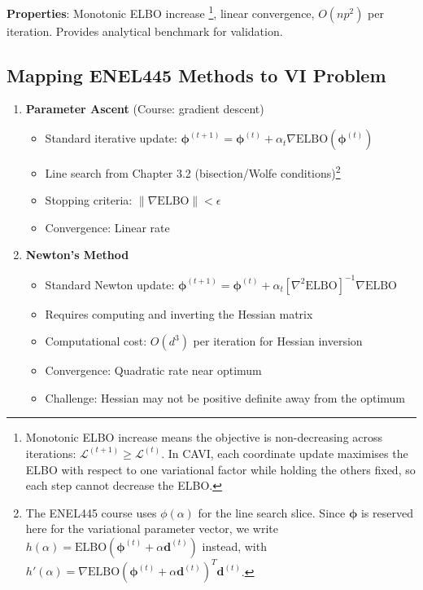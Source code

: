 \documentclass[11pt]{article}
\newcommand{\ELBO}{\text{ELBO}}
\begin{document}
\textbf{Properties}: Monotonic ELBO increase \footnote{Monotonic ELBO increase means the objective is non-decreasing across iterations: $\mathcal{L}^{(t+1)} \ge \mathcal{L}^{(t)}$. In CAVI, each coordinate update maximises the ELBO with respect to one variational factor while holding the others fixed, so each step cannot decrease the ELBO.}, linear convergence, $O(np^2)$ per iteration. Provides analytical benchmark for validation.


\newpage 

\subsection*{Mapping ENEL445 Methods to VI Problem}

\begin{enumerate}[leftmargin=*]
\item \textbf{Parameter Ascent} (Course: gradient descent)
\begin{itemize}
\item Standard iterative update: $\bm{\phi}^{(t+1)} = \bm{\phi}^{(t)} + \alpha_t \nabla \ELBO(\bm{\phi}^{(t)})$
\item Line search from Chapter 3.2 (bisection/Wolfe conditions)\footnote{The ENEL445 course uses $\phi(\alpha)$ for the line search slice. Since $\bm{\phi}$ is reserved here for the variational parameter vector, we write $h(\alpha) = \text{ELBO}(\bm{\phi}^{(t)} + \alpha\bm{d}^{(t)})$ instead, with $h'(\alpha) = \nabla\text{ELBO}(\bm{\phi}^{(t)} + \alpha\bm{d}^{(t)})^T\bm{d}^{(t)}$.}
\item Stopping criteria: $\|\nabla \ELBO\| < \epsilon$
\item Convergence: Linear rate
\end{itemize}

\item \textbf{Newton's Method}   
\begin{itemize}
\item Standard Newton update: $\bm{\phi}^{(t+1)} = \bm{\phi}^{(t)} + \alpha_t [\nabla^2 \ELBO]^{-1} \nabla \ELBO$
\item Requires computing and inverting the Hessian matrix
\item Computational cost: $O(d^3)$ per iteration for Hessian inversion
\item Convergence: Quadratic rate near optimum
\item Challenge: Hessian may not be positive definite away from the optimum
\end{itemize}


\end{enumerate}
\end{document}
